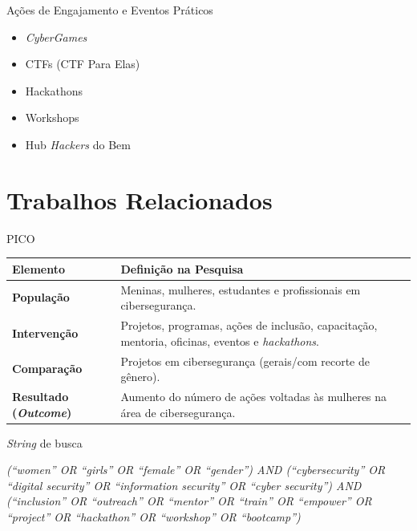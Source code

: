 \documentclass{beamer}
\begin{document}
		\begin{frame}{Ações de Engajamento e Eventos Práticos}
			\begin{itemize}
				\justifying
				\item \textit{CyberGames}
				\item CTFs (CTF Para Elas)
				\item Hackathons
				\item Workshops
				\item Hub \textit{Hackers} do Bem
			\end{itemize}
		\end{frame}
	\section{Trabalhos Relacionados}
		\begin{frame}{PICO}
			\vspace{0.3cm}
			\centering
			\begin{footnotesize}
				\begin{tabular}{|l|p{6.5cm}|}
					\hline
					\textbf{Elemento} & \textbf{Definição na Pesquisa} \\
					\hline
					\textbf{População} & Meninas, mulheres, estudantes e profissionais em cibersegurança. \\
					\hline
					\textbf{Intervenção} & Projetos, programas, ações de inclusão, capacitação, mentoria, oficinas, eventos e \textit{hackathons}. \\
					\hline
					\textbf{Comparação} & Projetos em cibersegurança (gerais/com recorte de gênero). \\
					\hline
					\textbf{Resultado (\textit{Outcome})} & Aumento do número de ações voltadas às mulheres na área de cibersegurança. \\
					\hline
				\end{tabular}
			\end{footnotesize}
			\vspace{0.2cm}
			\raggedright
		\end{frame}
		\begin{frame}{\textit{String} de busca}
			\begin{exampleblock}{}
				\justifying
				\textit{(\enquote{women} OR \enquote{girls} OR \enquote{female} OR \enquote{gender}) AND (\enquote{cybersecurity} OR \enquote{digital security} OR \enquote{information security} OR \enquote{cyber security}) AND (\enquote{inclusion} OR \enquote{outreach} OR \enquote{mentor} OR \enquote{train} OR \enquote{empower} OR \enquote{project} OR \enquote{hackathon} OR \enquote{workshop} OR \enquote{bootcamp})}
			\end{exampleblock}
		\end{frame}
\end{document}
